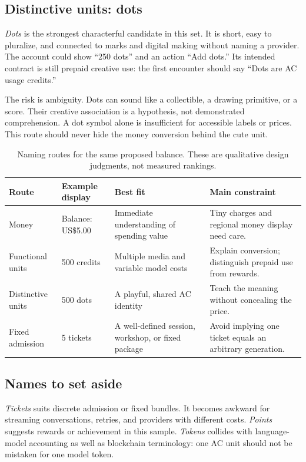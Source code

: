 \documentclass[10pt,letterpaper,twocolumn]{article}
\begin{document}
\subsection{Distinctive units: dots}
\emph{Dots} is the strongest characterful candidate in this set. It is short, easy to pluralize, and connected to marks and digital making without naming a provider. The account could show ``250 dots'' and an action ``Add dots.'' Its intended contract is still prepaid creative use: the first encounter should say ``Dots are AC usage credits.''

The risk is ambiguity. Dots can sound like a collectible, a drawing primitive, or a score. Their creative association is a hypothesis, not demonstrated comprehension. A dot symbol alone is insufficient for accessible labels or prices. This route should never hide the money conversion behind the cute unit.

\begin{table}[t]
\small\renewcommand{\arraystretch}{1.22}
\caption{Naming routes for the same proposed balance. These are qualitative design judgments, not measured rankings.}\label{tab:names}
\begin{tabularx}{\textwidth}{@{}p{1.0in}p{1.3in}XX@{}}\toprule
Route & Example display & Best fit & Main constraint \\\midrule
Money & Balance: US\$5.00 & Immediate understanding of spending value & Tiny charges and regional money display need care. \\
Functional units & 500 credits & Multiple media and variable model costs & Explain conversion; distinguish prepaid use from rewards. \\
Distinctive units & 500 dots & A playful, shared AC identity & Teach the meaning without concealing the price. \\
Fixed admission & 5 tickets & A well-defined session, workshop, or fixed package & Avoid implying one ticket equals an arbitrary generation. \\\bottomrule
\end{tabularx}
\end{table}

\subsection{Names to set aside}
\emph{Tickets} suits discrete admission or fixed bundles. It becomes awkward for streaming conversations, retries, and providers with different costs. \emph{Points} suggests rewards or achievement in this sample. \emph{Tokens} collides with language-model accounting as well as blockchain terminology: one AC unit should not be mistaken for one model token.
\end{document}
